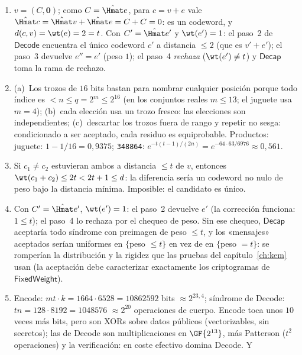 \begin{enumerate}[leftmargin=1.9em,itemsep=4pt]
  \item $v=(C,\mathbf{0})$; como $C=\hat{\Hmat}e$, para $c=v+e$
        vale $\hat{\Hmat}c=\hat{\Hmat}v+\hat{\Hmat}e=C+C=0$: es un
        codeword, y $d(c,v)=\wt(e)=2=t$. Con $C'=\hat{\Hmat}e'$ y
        $\wt(e')=1$: el paso~2 de $\textsf{Decode}$ encuentra el
        único codeword $c'$ a distancia $\le2$ (que es $v' + e'$);
        el paso~3 devuelve $e''=e'$ (peso $1$); el paso~4
        \emph{rechaza} ($\wt(e')\ne t$) y $\textsf{Decap}$ toma la
        rama de rechazo.
  \item (a)~Los trozos de $16$ bits bastan para nombrar cualquier
        posición porque todo índice es $<n\le q=2^m\le2^{16}$ (en
        los conjuntos reales $m\le13$; el juguete usa $m=4$);
        (b)~cada
        elección usa un trozo fresco: las elecciones son
        independientes; (c)~descartar los trozos fuera de rango y
        repetir no sesga: condicionado a ser aceptado, cada residuo
        es equiprobable. Productos: juguete:
        $1-1/16=0{,}9375$; \texttt{348864}:
        $e^{-t(t-1)/(2n)}=e^{-64\cdot63/6976}\approx0{,}561$.
  \item Si $c_1\ne c_2$ estuvieran ambos a distancia $\le t$ de
        $v$, entonces $\wt(c_1+c_2)\le2t<2t+1\le d$: la diferencia
        sería un codeword no nulo de peso bajo la distancia mínima.
        Imposible: el candidato es único.
  \item Con $C'=\hat{\Hmat}e'$, $\wt(e')=1$: el paso~2 devuelve
        $e'$ (la corrección funciona: $1\le t$); el paso~4 lo
        rechaza por el chequeo de peso. Sin ese chequeo,
        $\textsf{Decap}$ aceptaría todo síndrome con preimagen de
        peso $\le t$, y los «mensajes» aceptados serían uniformes en
        $\{$peso $\le t\}$ en vez de en $\{$peso $=t\}$: se
        romperían la distribución y la rigidez que las pruebas del
        capítulo~\ref{ch:kem} usan (la aceptación debe caracterizar
        exactamente los criptogramas de $\textsf{FixedWeight}$).
  \item \textsf{Encode}: $mt\cdot k=1664\cdot6528=\num{10862592}$
        bits $\approx2^{23{,}4}$; síndrome de \textsf{Decode}:
        $tn=128\cdot8192=\num{1048576}$ $\approx2^{20}$ operaciones
        de cuerpo. \textsf{Encode} toca unos $10$ veces más bits,
        pero son XORs sobre datos públicos (vectorizables, sin
        secretos); las de \textsf{Decode} son multiplicaciones en
        $\GF{2^{13}}$, más Patterson ($t^2$ operaciones) y la
        verificación: en coste efectivo domina \textsf{Decode}. Y

\end{enumerate}
